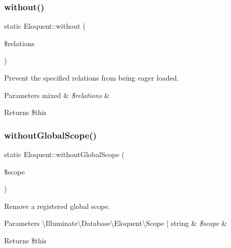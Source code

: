 \subsubsection{\texorpdfstring{without()}{without()}}
{\footnotesize\ttfamily static Eloquent\+::without (\begin{DoxyParamCaption}\item[{}]{\$relations }\end{DoxyParamCaption})\hspace{0.3cm}{\ttfamily [static]}}

Prevent the specified relations from being eager loaded.


\begin{DoxyParams}[1]{Parameters}
mixed & {\em \$relations} & \\
\hline
\end{DoxyParams}
\begin{DoxyReturn}{Returns}
\$this 
\end{DoxyReturn}
\mbox{\label{class_eloquent_a47d5d4f0f7be1ee5db65013ef9b79908}} 
\subsubsection{\texorpdfstring{without\+Global\+Scope()}{withoutGlobalScope()}}
{\footnotesize\ttfamily static Eloquent\+::without\+Global\+Scope (\begin{DoxyParamCaption}\item[{}]{\$scope }\end{DoxyParamCaption})\hspace{0.3cm}{\ttfamily [static]}}

Remove a registered global scope.


\begin{DoxyParams}[1]{Parameters}
\textbackslash{}\+Illuminate\textbackslash{}\+Database\textbackslash{}\+Eloquent\textbackslash{}\+Scope | string & {\em \$scope} & \\
\hline
\end{DoxyParams}
\begin{DoxyReturn}{Returns}
\$this 
\end{DoxyReturn}
\mbox{\label{class_eloquent_a65043ab2772d0ad732a64602fd6c3e2f}} 
